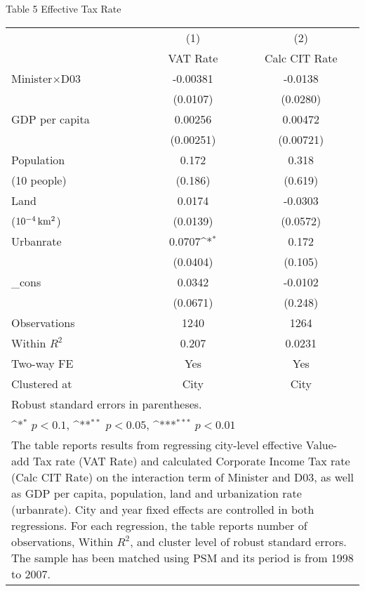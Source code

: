 \documentclass[11pt,a4paper]{article}
\begin{document}
\begin{center}
Table 5 Effective Tax Rate\\

\medskip
\begin{scriptsize}
{
\def\sym#1{\ifmmode^{#1}\else\(^{#1}\)\fi}
\begin{tabular}{l*{2}{c}}
\hline\hline
            &\multicolumn{1}{c}{(1)}&\multicolumn{1}{c}{(2)}\\
            &\multicolumn{1}{c}{VAT Rate}&\multicolumn{1}{c}{Calc CIT Rate}\\
\hline
Minister\(\times\)D03          &    -0.00381         &     -0.0138         \\
            &    (0.0107)         &    (0.0280)         \\
[1em]
GDP per capita &     0.00256         &     0.00472         \\
            &   (0.00251)         &   (0.00721)         \\
[1em]
Population      &       0.172         &       0.318         \\
(10 people)            &     (0.186)         &     (0.619)         \\
[1em]
Land       &      0.0174         &     -0.0303         \\
(${\rm 10^{-4} \, km^{2}}$)              &    (0.0139)         &    (0.0572)         \\
[1em]
Urbanrate   &      0.0707\sym{*}  &       0.172         \\
            &    (0.0404)         &     (0.105)         \\
[1em]
\_cons      &      0.0342         &     -0.0102         \\
            &    (0.0671)         &     (0.248)         \\
\hline
Observations       &        1240         &        1264         \\
Within $R^{2}$        &       0.207         &      0.0231         \\
Two-way FE   &   Yes       &    Yes       \\
Clustered at   &        City         &        City             \\
\hline\hline
\multicolumn{3}{l}{\footnotesize Robust standard errors in parentheses.}\\
\multicolumn{3}{l}{\footnotesize \sym{*} \(p<0.1\), \sym{**} \(p<0.05\), \sym{***} \(p<0.01\)}\\
\multicolumn{3}{p{6.5cm}}{\footnotesize The table reports results from regressing city-level effective Value-add Tax rate (VAT Rate) and calculated Corporate Income Tax rate (Calc CIT Rate) on the interaction term of Minister and D03, as well as GDP per capita, population, land and urbanization rate (urbanrate). City and year fixed effects are controlled in both regressions. For each regression, the table reports number of observations, Within $R^{2}$, and cluster level of robust standard errors. The sample has been matched using PSM and its period is from 1998 to 2007. }\\
\end{tabular}
}
\end{scriptsize}
\end{center}
\end{document}

